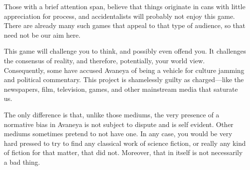Those with a brief attention span, believe that things originate in cans with little appreciation for process, and accidentalists will probably not enjoy this game. There are already many such games that appeal to that type of audience, so that need not be our aim here.

This game will challenge you to think, and possibly even offend you. It challenges the consensus of reality, and therefore, potentially, your world view. Consequently, some have accused Avaneya of being a vehicle for culture jamming and political commentary. This project is shamelessly guilty as charged---like the newspapers, film, television, games, and other mainstream media that saturate us. 

The only difference is that, unlike those mediums, the very presence of a normative bias in Avaneya is not subject to dispute and is self evident. Other mediums sometimes pretend to not have one. In any case, you would be very hard pressed to try to find any classical work of science fiction, or really any kind of fiction for that matter, that did not. Moreover, that in itself is not necessarily a bad thing.


